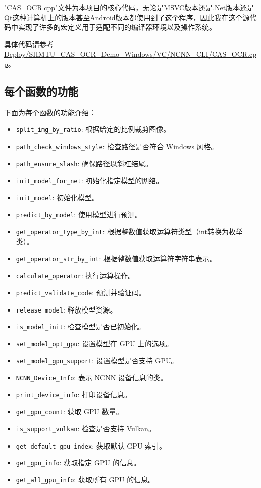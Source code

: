 "CAS\_OCR.cpp"文件为本项目的核心代码，无论是MSVC版本还是.Net版本还是Qt这种计算机上的版本甚至Android版本都使用到了这个程序，因此我在这个源代码中实现了许多的宏定义用于适配不同的编译器环境以及操作系统。

具体代码请参考\url{Deploy/SHMTU_CAS_OCR_Demo_Windows/VC/NCNN_CLI/CAS_OCR.cpp}。

\subsection{每个函数的功能}

下面为每个函数的功能介绍：

\begin{itemize}
	\item \texttt{split\_img\_by\_ratio}: 根据给定的比例裁剪图像。
	\item \texttt{path\_check\_windows\_style}: 检查路径是否符合 Windows 风格。
	\item \texttt{path\_ensure\_slash}: 确保路径以斜杠结尾。
	\item \texttt{init\_model\_for\_net}: 初始化指定模型的网络。
	\item \texttt{init\_model}: 初始化模型。
	\item \texttt{predict\_by\_model}: 使用模型进行预测。
	\item \texttt{get\_operator\_type\_by\_int}: 根据整数值获取运算符类型（int转换为枚举类）。
	\item \texttt{get\_operator\_str\_by\_int}: 根据整数值获取运算符字符串表示。
	\item \texttt{calculate\_operator}: 执行运算操作。
	\item \texttt{predict\_validate\_code}: 预测并验证码。
	\item \texttt{release\_model}: 释放模型资源。
	\item \texttt{is\_model\_init}: 检查模型是否已初始化。
	\item \texttt{set\_model\_opt\_gpu}: 设置模型在 GPU 上的选项。
	\item \texttt{set\_model\_gpu\_support}: 设置模型是否支持 GPU。
	\item \texttt{NCNN\_Device\_Info}: 表示 NCNN 设备信息的类。
	\item \texttt{print\_device\_info}: 打印设备信息。
	\item \texttt{get\_gpu\_count}: 获取 GPU 数量。
	\item \texttt{is\_support\_vulkan}: 检查是否支持 Vulkan。
	\item \texttt{get\_default\_gpu\_index}: 获取默认 GPU 索引。
	\item \texttt{get\_gpu\_info}: 获取指定 GPU 的信息。
	\item \texttt{get\_all\_gpu\_info}: 获取所有 GPU 的信息。
\end{itemize}

